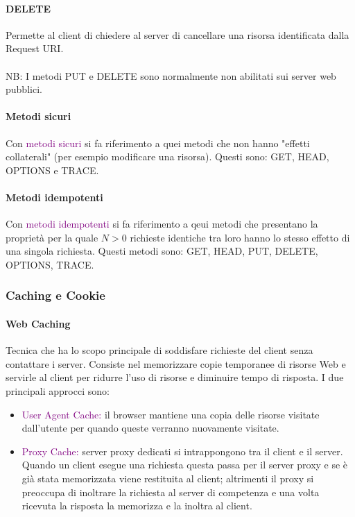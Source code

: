 \paragraph{DELETE} Permette al client di chiedere al server di cancellare una risorsa identificata dalla Request URI.
\\ \\ NB: I metodi PUT e DELETE sono normalmente non abilitati sui server web pubblici.

\paragraph{Metodi sicuri} Con \textcolor{purple}{metodi sicuri} si fa riferimento a quei metodi che non hanno "effetti collaterali" (per esempio modificare una risorsa). Questi sono: GET, HEAD, OPTIONS e TRACE.

\paragraph{Metodi idempotenti} Con \textcolor{purple}{metodi idempotenti} si fa riferimento a qeui metodi che presentano la proprietà per la quale $N>0$ richieste identiche tra loro hanno lo stesso effetto di una singola richiesta. Questi metodi sono: GET, HEAD, PUT, DELETE, OPTIONS, TRACE.

\subsubsection{Caching e Cookie}
\paragraph{Web Caching} Tecnica che ha lo scopo principale di soddisfare richieste del client senza contattare i server. Consiste nel memorizzare copie temporanee di risorse Web e servirle al client per ridurre l’uso di risorse e diminuire tempo di risposta. I due principali approcci sono:
\begin{itemize}
    \item \textcolor{purple}{User Agent Cache:} il browser mantiene una copia delle risorse visitate dall'utente per quando queste verranno nuovamente visitate.
    \item \textcolor{purple}{Proxy Cache:} server proxy dedicati si intrappongono tra il client e il server. Quando un client esegue una richiesta questa passa per il server proxy e se è già stata memorizzata viene restituita al client; altrimenti il proxy si preoccupa di inoltrare la richiesta al server di competenza e una volta ricevuta la risposta la memorizza e la inoltra al client.
\end{itemize}

